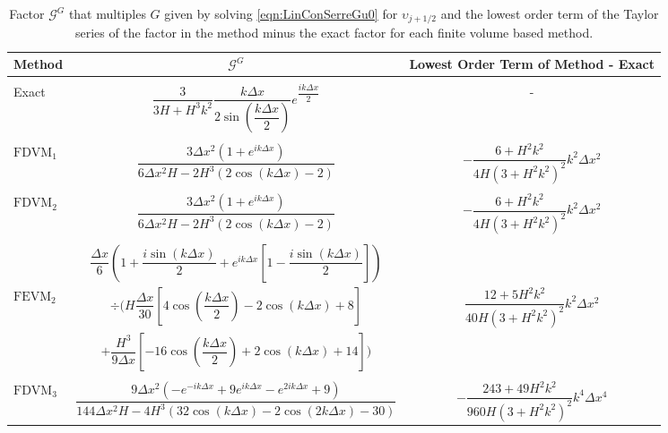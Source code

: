 \begin{landscape}
	\begin{table}
		\centering   
		\begin{tabular}{l  c  c}
			Method& $\mathcal{G}^G$ & Lowest Order Term of Method - Exact \T \\
			\hline \\ 
			Exact &  $\dfrac{3 }{3H + H^3k^2} \dfrac{k\Delta x}{2 \sin\left(\dfrac{k \Delta x}{2}\right)}e^{\dfrac{ik\Delta x}{2}}$ & - \\ \\
			$\text{FDVM}_1$& $\dfrac{3\Delta x^2 \left(1 + e^{ik\Delta x}\right)}{6\Delta x^2 H - 2H^3 \left(2\cos\left(k\Delta x\right) - 2\right)}$ & $-\dfrac{6 +H^2k^2}{4H \left(3 + H^2k^2\right)^2}k^2 \Delta x^2$  \\ \\
			$\text{FDVM}_2$& $\dfrac{3 \Delta x^2 \left({1 + e^{ik\Delta x}}\right)}{6 \Delta x^2 H - 2H^3 \left(2\cos\left(k\Delta x\right) - 2\right)}$ & $-\dfrac{6 +H^2k^2}{4H \left(3 + H^2k^2\right)^2}k^2 \Delta x^2$  \\ \\
			& $\dfrac{\Delta x}{6} \left(1 + \dfrac{i \sin\left(k \Delta x\right)}{2} + e^{ik\Delta x}\left[1 - \dfrac{i \sin\left(k \Delta x\right)}{2}\right] \right)$ & \\  $\text{FEVM}_2$ & $\div  \Bigg( H\dfrac{\Delta x}{30} \left[4\cos\left(\dfrac{k \Delta x}{2}\right) - 2\cos\left({k \Delta x}\right) + 8\right] $  & $\dfrac{12 + 5H^2k^2}{40H \left(3 + H^2k^2\right)^2}k^2 \Delta x^2$ \\ &$+ \dfrac{H^3 }{9\Delta x}\left[-16\cos\left(\dfrac{k\Delta x}{2}\right) + 2 \cos\left(k \Delta x\right) + 14\right]    \Bigg)$ & \\ \\
			$\text{FDVM}_3$&  $\dfrac{9 \Delta x^2 \left({-e^{-ik\Delta x} + 9e^{ik\Delta x} - e^{2ik\Delta x} + 9}\right)}{144 \Delta x^2H - 4H^3\left(32\cos\left(k \Delta x\right) -2\cos\left(2k \Delta x\right) - 30\right)}$ & $-\dfrac{243 + 49H^2k^2}{960H\left(3 + H^2k^2\right)^2}k^4 \Delta x^4$ \T \B \\
			\hline
		\end{tabular}
		\caption{Factor $\mathcal{G}^G$ that multiples $G$ given by solving \eqref{eqn:LinConSerreGu0} for $\upsilon_{j+1/2}$ and the lowest order term of the Taylor series of the factor in the method minus the exact factor for each finite volume based method.}
		\label{tab:GGfactor} 
	\end{table}
\end{landscape}


